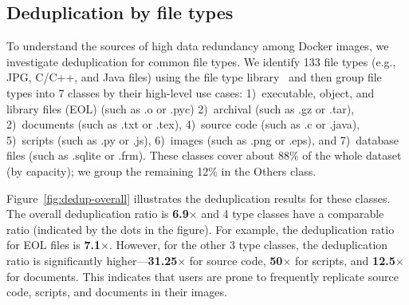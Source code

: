 \subsection{Deduplication by file types}



To understand the sources of high data redundancy among Docker images, we
investigate deduplication for common file types.
%
We identify 133 file types (e.g., JPG, C/C++, and Java files)
using the file type library~\cite{pymagic} and then group file types into 7
classes by their high-level use cases:
%
1)~executable, object, and library files (EOL) (such as .o or .pyc)
%
%
2)~archival (such as .gz or .tar),
%
2)~documents (such as .txt or .tex),
%
4)~source code (such as .c or .java),
%
5)~scripts (such as .py or .js),
%
6)~images (such as .png or .eps), and
%
7)~database files (such as .sqlite or .frm). 
%
These classes cover about 88\% of the whole dataset (by capacity);
we group the remaining 12\% in the Others class.
%

Figure~\ref{fig:dedup-overall} illustrates the deduplication results for these
classes.
%
The overall deduplication ratio is \textbf{6.9$\times$} and 4 type classes
have a comparable ratio (indicated by the dots in the figure).
%
For example, the deduplication ratio for EOL files is \textbf{7.1$\times$}.
%
However, for the other 3 type classes, the
deduplication ratio is significantly
higher---\textbf{31.25$\times$} for source code,
\textbf{50$\times$} for scripts, and \textbf{12.5$\times$} for documents.
%
This indicates that users are prone to frequently replicate
source code, scripts, and documents in their images.
%

